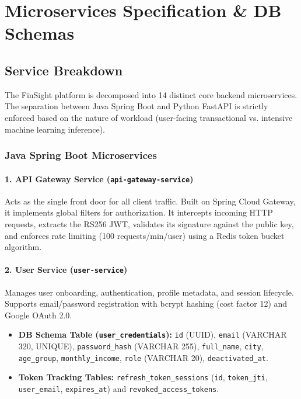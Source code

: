 \documentclass[12pt,a4paper]{report}
\begin{document}
\setcounter{chapter}{4}

\chapter{Microservices Specification \& DB Schemas}

\section{Service Breakdown}

The FinSight platform is decomposed into 14 distinct core backend microservices. The separation between Java Spring Boot and Python FastAPI is strictly enforced based on the nature of workload (user-facing transactional vs. intensive machine learning inference).

\subsection{Java Spring Boot Microservices}

\subsubsection{1. API Gateway Service (\texttt{api-gateway-service})}
Acts as the single front door for all client traffic. Built on Spring Cloud Gateway, it implements global filters for authorization. It intercepts incoming HTTP requests, extracts the RS256 JWT, validates its signature against the public key, and enforces rate limiting (100 requests/min/user) using a Redis token bucket algorithm.

\subsubsection{2. User Service (\texttt{user-service})}
Manages user onboarding, authentication, profile metadata, and session lifecycle. Supports email/password registration with bcrypt hashing (cost factor 12) and Google OAuth 2.0.
\begin{itemize}[leftmargin=1.5em, noitemsep]
  \item \textbf{DB Schema Table (\texttt{user\_credentials}):} \texttt{id} (UUID), \texttt{email} (VARCHAR 320, UNIQUE), \texttt{password\_hash} (VARCHAR 255), \texttt{full\_name}, \texttt{city}, \texttt{age\_group}, \texttt{monthly\_income}, \texttt{role} (VARCHAR 20), \texttt{deactivated\_at}.
  \item \textbf{Token Tracking Tables:} \texttt{refresh\_token\_sessions} (\texttt{id}, \texttt{token\_jti}, \texttt{user\_email}, \texttt{expires\_at}) and \texttt{revoked\_access\_tokens}.
\end{itemize}
\end{document}

